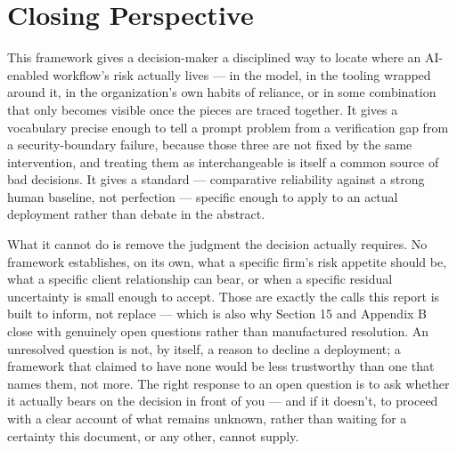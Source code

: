 \section*{Closing Perspective}

This framework gives a decision-maker a disciplined way to locate where an AI-enabled workflow's risk actually lives --- in the model, in the tooling wrapped around it, in the organization's own habits of reliance, or in some combination that only becomes visible once the pieces are traced together. It gives a vocabulary precise enough to tell a prompt problem from a verification gap from a security-boundary failure, because those three are not fixed by the same intervention, and treating them as interchangeable is itself a common source of bad decisions. It gives a standard --- comparative reliability against a strong human baseline, not perfection --- specific enough to apply to an actual deployment rather than debate in the abstract.

What it cannot do is remove the judgment the decision actually requires. No framework establishes, on its own, what a specific firm's risk appetite should be, what a specific client relationship can bear, or when a specific residual uncertainty is small enough to accept. Those are exactly the calls this report is built to inform, not replace --- which is also why Section 15 and Appendix B close with genuinely open questions rather than manufactured resolution. An unresolved question is not, by itself, a reason to decline a deployment; a framework that claimed to have none would be less trustworthy than one that names them, not more. The right response to an open question is to ask whether it actually bears on the decision in front of you --- and if it doesn't, to proceed with a clear account of what remains unknown, rather than waiting for a certainty this document, or any other, cannot supply.
